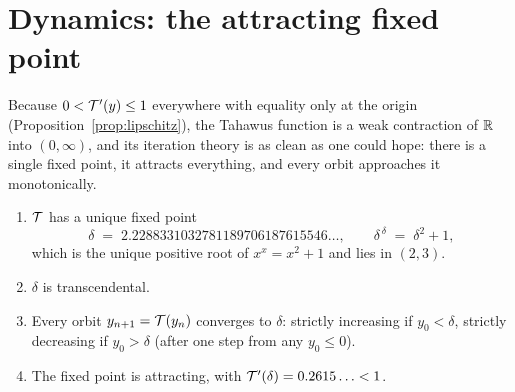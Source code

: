 \section{Dynamics: the attracting fixed point}\label{sec:dynamics}

Because $0 < \mathcal{T}'(y) \le 1$ everywhere with equality only at the
origin (Proposition~\ref{prop:lipschitz}), the Tahawus function is a
weak contraction of $\mathbb{R}$ into $(0,\infty)$, and its iteration theory
is as clean as one could hope: there is a single fixed point, it
attracts everything, and every orbit approaches it monotonically.

\begin{theorem}\label{thm:fixedpoint}
\begin{enumerate}[label=\textup{(\roman*)}, leftmargin=2.4em]
\item $\mathcal{T}$ has a unique fixed point
\[
    \delta \;=\; 2.2288331032781189706187615546\ldots,
    \qquad
    \delta^{\,\delta} \;=\; \delta^{2} + 1 ,
\]
which is the unique positive root of $x^{x} = x^{2}+1$ and lies in
$(2,3)$.
\item $\delta$ is transcendental.
\item Every orbit $y_{n+1} = \mathcal{T}(y_{n})$ converges to $\delta$:
strictly increasing if $y_{0} < \delta$, strictly decreasing if
$y_{0} > \delta$ (after one step from any $y_{0} \le 0$).
\item The fixed point is attracting, with
$\mathcal{T}'(\delta) = 0.2615\ldots < 1$.
\end{enumerate}
\end{theorem}

